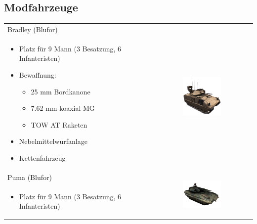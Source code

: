 \subsection{Modfahrzeuge}
	\begin{longtable}{lc} 
		\toprule
		Bradley (Blufor) & \multirow{2}{*}{\includegraphics[width=0.4\textwidth]{./img/tutorials/spz/bradley}}\\
		\begin{minipage}[t]{0.4\textwidth}
			\begin{itemize}
				\item Platz für 9 Mann (3 Besatzung, 6 Infanteristen)
				\item Bewaffnung:
				\begin{itemize}
					\item 25 mm Bordkanone
					\item 7.62 mm koaxial MG
					\item TOW AT Raketen
				\end{itemize}
				\item Nebelmittelwurfanlage
				\item Kettenfahrzeug
			\end{itemize}
		\end{minipage}\\
		\midrule
		Puma (Blufor) & \multirow{2}{*}{\includegraphics[width=0.4\textwidth]{./img/tutorials/spz/puma}}\\
		\begin{minipage}[t]{0.4\textwidth}
			\begin{itemize}
				\item Platz für 9 Mann (3 Besatzung, 6 Infanteristen)

\end{itemize}
\end{minipage}
\end{longtable}
